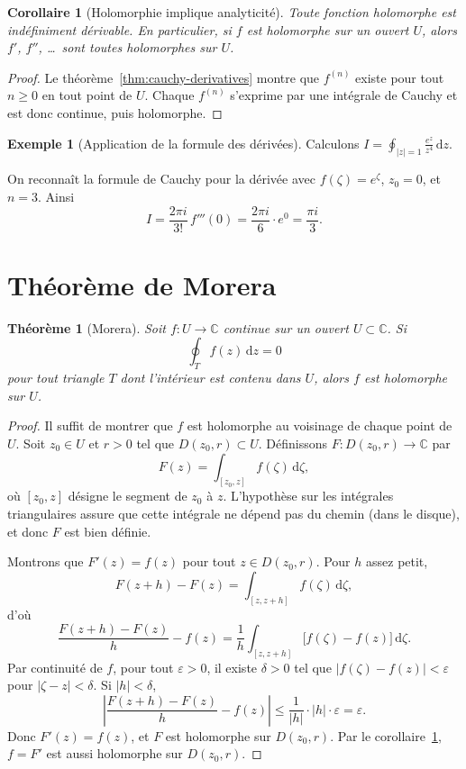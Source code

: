 \documentclass[12pt,a4paper,openany]{book}
\theoremstyle{definition}
\newtheorem{exemple}[definition]{Exemple}
\theoremstyle{plain}
\newtheorem{theoreme}[definition]{Théorème}
\newtheorem{corollaire}[definition]{Corollaire}
\theoremstyle{remark}
\newcommand{\C}{\mathbb{C}}
\newcommand{\dd}{\mathrm{d}}
\newcommand{\abs}[1]{\left|#1\right|}
\begin{document}
\begin{corollaire}[Holomorphie implique analyticité]\label{cor:holo-implies-analytic}
Toute fonction holomorphe est indéfiniment dérivable. En particulier,
si $f$ est holomorphe sur un ouvert $U$, alors $f'$, $f''$, \ldots\ sont
toutes holomorphes sur $U$.
\end{corollaire}

\begin{proof}
Le théorème~\ref{thm:cauchy-derivatives} montre que $f^{(n)}$ existe
pour tout $n \geq 0$ en tout point de $U$. Chaque $f^{(n)}$ s'exprime
par une intégrale de Cauchy et est donc continue, puis holomorphe.
\end{proof}

\begin{exemple}[Application de la formule des dérivées]\label{ex:cauchy-deriv-calc}
Calculons $\displaystyle I = \oint_{\abs{z}=1} \frac{e^z}{z^4}\,\dd z$.

On reconnaît la formule de Cauchy pour la dérivée avec $f(\zeta) = e^\zeta$,
$z_0 = 0$, et $n = 3$. Ainsi
\[
  I = \frac{2\pi i}{3!}\,f'''(0) = \frac{2\pi i}{6}\cdot e^0 = \frac{\pi i}{3}.
\]
\end{exemple}

\section{Théorème de Morera}

\begin{theoreme}[Morera]\label{thm:morera}
Soit $f \colon U \to \C$ continue sur un ouvert $U \subset \C$. Si
\[
  \oint_T f(z)\,\dd z = 0
\]
pour tout triangle $T$ dont l'intérieur est contenu dans $U$, alors $f$
est holomorphe sur $U$.
\end{theoreme}

\begin{proof}
Il suffit de montrer que $f$ est holomorphe au voisinage de chaque point
de $U$. Soit $z_0 \in U$ et $r > 0$ tel que $D(z_0, r) \subset U$.
Définissons $F \colon D(z_0, r) \to \C$ par
\[
  F(z) = \int_{[z_0, z]} f(\zeta)\,\dd\zeta,
\]
où $[z_0, z]$ désigne le segment de $z_0$ à $z$. L'hypothèse sur les
intégrales triangulaires assure que cette intégrale ne dépend pas du
chemin (dans le disque), et donc $F$ est bien définie.

Montrons que $F'(z) = f(z)$ pour tout $z \in D(z_0, r)$. Pour $h$
assez petit,
\[
  F(z+h) - F(z) = \int_{[z, z+h]} f(\zeta)\,\dd\zeta,
\]
d'où
\[
  \frac{F(z+h) - F(z)}{h} - f(z)
  = \frac{1}{h}\int_{[z,z+h]} \bigl[f(\zeta) - f(z)\bigr]\,\dd\zeta.
\]
Par continuité de $f$, pour tout $\varepsilon > 0$, il existe $\delta > 0$
tel que $\abs{f(\zeta) - f(z)} < \varepsilon$ pour $\abs{\zeta - z} < \delta$.
Si $\abs{h} < \delta$,
\[
  \abs{\frac{F(z+h)-F(z)}{h} - f(z)}
  \leq \frac{1}{\abs{h}} \cdot \abs{h} \cdot \varepsilon = \varepsilon.
\]
Donc $F'(z) = f(z)$, et $F$ est holomorphe sur $D(z_0, r)$. Par le
corollaire~\ref{cor:holo-implies-analytic}, $f = F'$ est aussi holomorphe
sur $D(z_0,r)$.
\end{proof}
\end{document}
